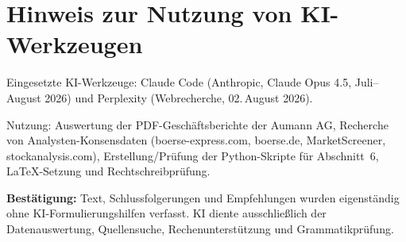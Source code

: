 \section*{Hinweis zur Nutzung von KI-Werkzeugen}

Eingesetzte KI-Werkzeuge: Claude Code (Anthropic, Claude Opus 4.5, Juli--August 2026) und Perplexity (Webrecherche, 02.\,August 2026).

Nutzung: Auswertung der PDF-Geschäftsberichte der Aumann AG, Recherche von Analysten-Konsensdaten (boerse-express.com, boerse.de, MarketScreener, stockanalysis.com), Erstellung/Prüfung der Python-Skripte für Abschnitt~6, \LaTeX-Setzung und Rechtschreibprüfung.

\noindent\textbf{Bestätigung:} Text, Schlussfolgerungen und Empfehlungen wurden eigenständig ohne KI-Formulierungshilfen verfasst. KI diente ausschließlich der Datenauswertung, Quellensuche, Rechenunterstützung und Grammatikprüfung.
